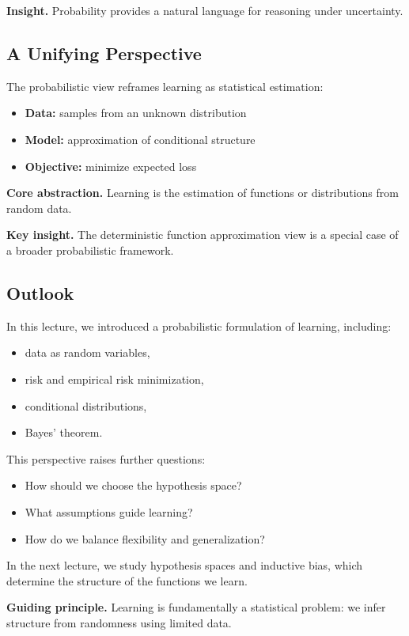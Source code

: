 \medskip

\noindent
\textbf{Insight.}  
Probability provides a natural language for reasoning under uncertainty.

\subsection{A Unifying Perspective}

The probabilistic view reframes learning as statistical estimation:

\begin{itemize}
    \item \textbf{Data:} samples from an unknown distribution
    \item \textbf{Model:} approximation of conditional structure
    \item \textbf{Objective:} minimize expected loss
\end{itemize}

\medskip

\noindent
\textbf{Core abstraction.}  
Learning is the estimation of functions or distributions from random data.

\medskip

\noindent
\textbf{Key insight.}  
The deterministic function approximation view is a special case of a broader probabilistic framework.

\subsection{Outlook}

In this lecture, we introduced a probabilistic formulation of learning, including:

\begin{itemize}
    \item data as random variables,
    \item risk and empirical risk minimization,
    \item conditional distributions,
    \item Bayes’ theorem.
\end{itemize}

\medskip

\noindent
This perspective raises further questions:

\begin{itemize}
    \item How should we choose the hypothesis space?
    \item What assumptions guide learning?
    \item How do we balance flexibility and generalization?
\end{itemize}

\medskip

\noindent
In the next lecture, we study hypothesis spaces and inductive bias, which determine the structure of the functions we learn.

\medskip

\noindent
\textbf{Guiding principle.}  
Learning is fundamentally a statistical problem: we infer structure from randomness using limited data.